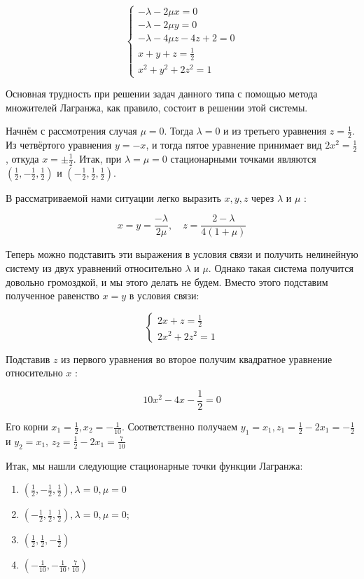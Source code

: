 \documentclass[a4paper,12pt]{article} %
\begin{document}
$$
\left\{\begin{array}{l}
-\lambda-2 \mu x=0 \\
-\lambda-2 \mu y=0 \\
-\lambda-4 \mu z-4 z+2=0 \\
x+y+z=\frac{1}{2} \\
x^{2}+y^{2}+2 z^{2}=1
\end{array}\right.
$$

Основная трудность при решении задач данного типа с помощью метода множителей Лагранжа, как правило, состоит в решении этой системы.

Начнём с рассмотрения случая $\mu=0$. Тогда $\lambda=0$ и из третьего уравнения $z=\frac{1}{2}$. Из четвёртого уравнения $y=-x$, и тогда пятое уравнение принимает вид $2 x^{2}=\frac{1}{2}$, откуда $x= \pm \frac{1}{2}$. Итак, при $\lambda=\mu=0$ стационарными точками являются $\left(\frac{1}{2},-\frac{1}{2}, \frac{1}{2}\right)$ и $\left(-\frac{1}{2}, \frac{1}{2}, \frac{1}{2}\right)$.

В рассматриваемой нами ситуации легко выразить $x, y, z$ через $\lambda$ и $\mu$ :

$$
x=y=\frac{-\lambda}{2 \mu}, \quad z=\frac{2-\lambda}{4(1+\mu)}
$$

Теперь можно подставить эти выражения в условия связи и получить нелинейную систему из двух уравнений относительно $\lambda$ и $\mu$. Однако такая система получится довольно громоздкой, и мы этого делать не будем. Вместо этого подставим полученное равенство $x=y$ в условия связи:

$$
\left\{\begin{array}{l}
2 x+z=\frac{1}{2} \\
2 x^{2}+2 z^{2}=1
\end{array}\right.
$$

Подставив $z$ из первого уравнения во второе получим квадратное уравнение относительно $x$ :

$$
10 x^{2}-4 x-\frac{1}{2}=0
$$

Его корни $x_{1}=\frac{1}{2}, x_{2}=-\frac{1}{10}$. Соответственно получаем $y_{1}=x_{1}, z_{1}=\frac{1}{2}-2 x_{1}=-\frac{1}{2}$ и $y_{2}=x_{1}$, $z_{2}=\frac{1}{2}-2 x_{1}=\frac{7}{10}$

Итак, мы нашли следующие стационарные точки функции Лагранжа:

\begin{enumerate}
\item $\left(\frac{1}{2},-\frac{1}{2}, \frac{1}{2}\right), \lambda=0, \mu=0$

\item $\left(-\frac{1}{2}, \frac{1}{2}, \frac{1}{2}\right), \lambda=0, \mu=0$;

\item $\left(\frac{1}{2}, \frac{1}{2},-\frac{1}{2}\right)$

\item $\left(-\frac{1}{10},-\frac{1}{10}, \frac{7}{10}\right)$

\end{enumerate}
\end{document}
